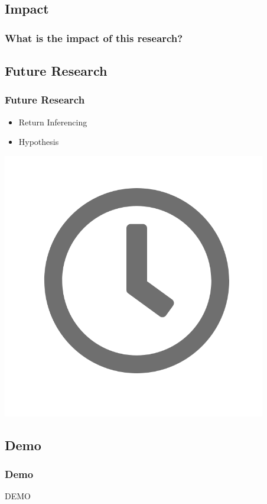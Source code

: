 \subsection{Impact}
\begin{frame}
  \frametitle{What is the impact of this research?}
  \begin{center}
    \begin{table}[htbp]
      \centering
    \end{table}
  \end{center}
\end{frame}

\subsection{Future Research}
\begin{frame}
  \frametitle{Future Research}
  \begin{center}
    \begin{itemize}
      \item {Return Inferencing}
      \item {Hypothesis}
    \end{itemize}
    \includegraphics[scale = 0.25]{images/clock}
  \end{center}
\end{frame}

\subsection{Demo}
\begin{frame}
  \frametitle{Demo}
  \begin{center}
    \huge{DEMO}
  
\end{center}
\end{frame}
